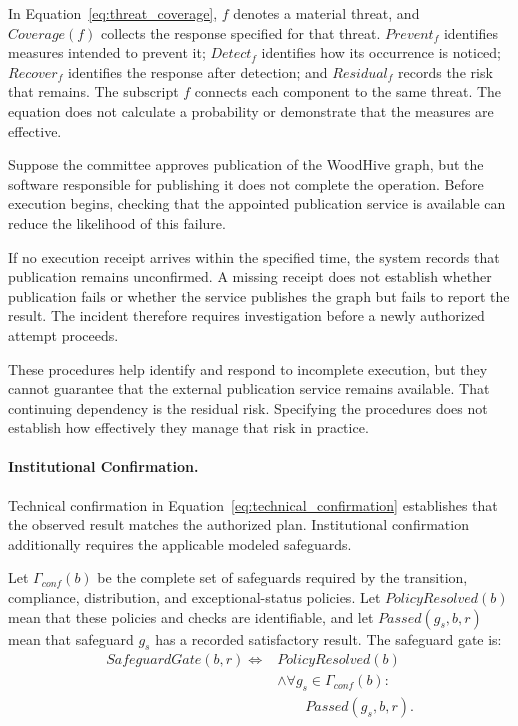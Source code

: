 \documentclass[journal]{IEEEtran}
\begin{document}
In Equation~\ref{eq:threat_coverage}, $f$ denotes a material threat,
and $Coverage(f)$ collects the response specified for that threat.
$Prevent_f$ identifies measures intended to prevent it;
$Detect_f$ identifies how its occurrence is noticed;
$Recover_f$ identifies the response after detection; and
$Residual_f$ records the risk that remains. The subscript $f$
connects each component to the same threat. The equation does not
calculate a probability or demonstrate that the measures are effective.

Suppose the committee approves publication of the WoodHive
graph, but the software responsible for publishing it does
not complete the operation. Before execution begins, checking
that the appointed publication service is available can reduce
the likelihood of this failure.

If no execution receipt arrives within the specified time,
the system records that publication remains unconfirmed.
A missing receipt does not establish whether publication
fails or whether the service publishes the graph but fails
to report the result. The incident therefore requires
investigation before a newly authorized attempt proceeds.

These procedures help identify and respond to incomplete
execution, but they cannot guarantee that the external
publication service remains available. That continuing
dependency is the residual risk. Specifying the procedures
does not establish how effectively they manage that risk
in practice.

\paragraph{Institutional Confirmation.}

Technical confirmation in Equation~\ref{eq:technical_confirmation}
establishes that the observed result matches the authorized
plan. Institutional confirmation additionally requires the
applicable modeled safeguards.

Let $\Gamma_{conf}(b)$ be the complete set of safeguards
required by the transition, compliance, distribution, and
exceptional-status policies. Let $PolicyResolved(b)$ mean
that these policies and checks are identifiable, and let
$Passed(g_s,b,r)$ mean that safeguard $g_s$ has a recorded
satisfactory result. The safeguard gate is:
\begin{equation}
\label{eq:safeguard_gate}
\begin{aligned}
SafeguardGate(b,r)\iff{}&
PolicyResolved(b)\\
&\land\forall g_s\in\Gamma_{conf}(b):\\
&\qquad Passed(g_s,b,r).
\end{aligned}
\end{equation}
\end{document}
